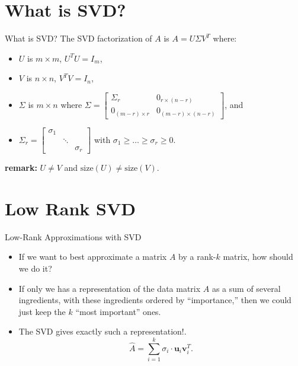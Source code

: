 \documentclass[aspectratio=169,xcolor=dvipsnames]{beamer}
\begin{document}
\section{What is SVD?}
\begin{frame}{What is SVD?}
The SVD factorization of $A$ is $A=U\Sigma V^{T}$ where:
\begin{itemize}
    \item $U$ is $m\times m$, $U^{T} U=I_{m}$, 
    \item $V$ is $n\times n$, $V^{T} V = I_{n}$,
    \item $\Sigma$ is $m\times n$ where $\Sigma = \begin{bmatrix}
        \Sigma_{r} & 0_{r\times (n-r)}\\
        0_{(m-r)\times r} & 0_{(m-r)\times (n-r)}
    \end{bmatrix}$, and
    \item $\Sigma_r = \begin{bmatrix}
        \sigma_1 & & \\
         & \ddots & \\
          & & \sigma_r 
    \end{bmatrix}$ with $\sigma_1 \geq \dots \geq \sigma_r \geq 0 $.
\end{itemize}

\textbf{remark:} $U \neq V$ and $\text{size}(U) \neq \text{size}(V)$.
\end{frame}

\section{Low Rank SVD}
\begin{frame}{Low-Rank Approximations with SVD}
\begin{itemize}
    \item If we want to best approximate a matrix $A$ by a rank-$k$ matrix, how should we do it?
    \item If only we has a representation of the data matrix $A$ as a sum of several ingredients, with these ingredients ordered by \enquote{importance,} then we could just keep the $k$ \enquote{most important} ones. \item The SVD gives exactly such a representation!.
    \begin{equation}
        \label{eq:1}
        \hat{A} = \sum^{k}_{i=1} \sigma_{i} \cdot \textbf{u}_i \textbf{v}^{T}_i .
    \end{equation}
  \end{itemize}
\end{frame}
\end{document}
